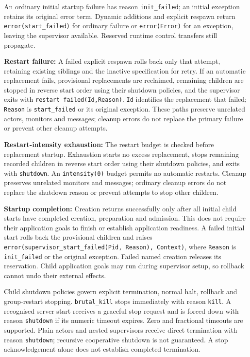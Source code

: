 An ordinary initial startup failure has reason \texttt{init\_failed}; an
initial exception retains its original error term. Dynamic additions and
explicit respawn return \texttt{error(start\_failed)} for ordinary failure or
\texttt{error(Error)} for an exception, leaving the supervisor available.
Reserved runtime control transfers still propagate.

\textbf{Restart failure:} A failed explicit respawn rolls back
only that attempt, retaining existing siblings and the inactive specification for retry. If an
automatic replacement fails, provisional replacements are reclaimed, remaining children are stopped
in reverse start order using their shutdown policies, and the supervisor exits with
\texttt{restart\_\allowbreak{}failed(\allowbreak{}Id,\allowbreak{}Reason)}. \texttt{Id} identifies the
replacement that failed; \texttt{Reason} is \texttt{start\_\allowbreak{}failed} or its original
exception. These paths preserve unrelated actors,
monitors and messages; cleanup errors do not replace the primary failure or prevent other cleanup
attempts.

\textbf{Restart-intensity exhaustion:} The restart budget is checked before replacement startup.
Exhaustion starts no excess replacement, stops remaining recorded children in reverse start order
using their shutdown policies, and exits with \texttt{shutdown}. An \texttt{intensity(0)} budget
permits no automatic restarts. Cleanup preserves unrelated monitors and messages; ordinary cleanup
errors do not replace the shutdown reason or prevent attempts to stop other children.

\textbf{Startup completion:} Creation returns successfully only after all
initial child starts have completed creation, preparation and admission. This
does not require their application goals to finish or establish application
readiness. A failed initial start rolls back the provisional children and
raises \texttt{error(\allowbreak{}supervisor\_\allowbreak{}start\_\allowbreak{}failed(\allowbreak{}Pid,\allowbreak{} Reason),\allowbreak{} Context)}, where
\texttt{Reason} is \texttt{init\_failed} or the original exception. Failed
named creation releases its reservation. Child application goals may run
during supervisor setup, so rollback cannot undo their external effects.

Child shutdown policies govern explicit termination, normal halt, rollback
and group-restart stopping. \texttt{brutal\_\allowbreak{}kill} stops immediately with reason \texttt{kill}. A
recognised server start receives a graceful stop request and is forced down with reason
\texttt{shutdown} if its numeric timeout expires. Zero and fractional timeouts are supported. Plain
actors and nested supervisors receive direct termination with reason \texttt{shutdown}; recursive
cooperative shutdown is not guaranteed. A stop acknowledgement alone does not establish completed
termination.

